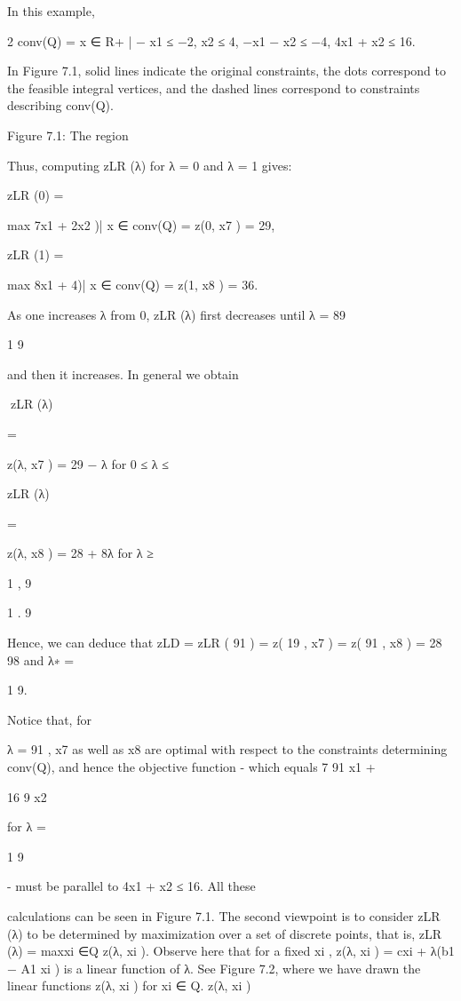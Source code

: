 In this example,

2
conv(Q) = {x ∈ R+
| − x1 ≤ −2, x2 ≤ 4, −x1 − x2 ≤ −4, 4x1 + x2 ≤ 16}.

In Figure 7.1, solid lines indicate the original constraints, the dots correspond to the feasible integral
vertices, and the dashed lines correspond to constraints describing conv(Q).

Figure 7.1: The region

Thus, computing zLR (λ) for λ = 0 and λ = 1 gives:

zLR (0) =

max {7x1 + 2x2 )| x ∈ conv(Q)} = z(0, x7 ) = 29,

zLR (1) =

max {8x1 + 4)| x ∈ conv(Q)} = z(1, x8 ) = 36.

As one increases λ from 0, zLR (λ) first decreases until λ =
89

1
9

and then it increases. In general we obtain

zLR (λ)

=

z(λ, x7 ) = 29 − λ for 0 ≤ λ ≤

zLR (λ)

=

z(λ, x8 ) = 28 + 8λ for λ ≥

1
,
9

1
.
9

Hence, we can deduce that zLD = zLR ( 91 ) = z( 19 , x7 ) = z( 91 , x8 ) = 28 98 and λ∗ =

1
9.

Notice that, for

λ = 91 , x7 as well as x8 are optimal with respect to the constraints determining conv(Q), and hence the
objective function - which equals 7 91 x1 +

16
9 x2

for λ =

1
9

- must be parallel to 4x1 + x2 ≤ 16. All these

calculations can be seen in Figure 7.1.
The second viewpoint is to consider zLR (λ) to be determined by maximization over a set of discrete
points, that is,
zLR (λ) = maxxi ∈Q z(λ, xi ).
Observe here that for a fixed xi , z(λ, xi ) = cxi + λ(b1 − A1 xi ) is a linear function of λ. See Figure 7.2,
where we have drawn the linear functions z(λ, xi ) for xi ∈ Q.
z(λ, xi )

